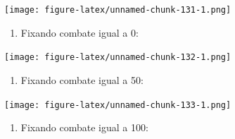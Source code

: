 \documentclass[
]{article}
\newenvironment{Shaded}{\begin{snugshade}}{\end{snugshade}}
\newcommand{\DataTypeTok}[1]{\textcolor[rgb]{0.13,0.29,0.53}{#1}}
\newcommand{\DecValTok}[1]{\textcolor[rgb]{0.00,0.00,0.81}{#1}}
\newcommand{\KeywordTok}[1]{\textcolor[rgb]{0.13,0.29,0.53}{\textbf{#1}}}
\newcommand{\NormalTok}[1]{#1}
\newcommand{\OperatorTok}[1]{\textcolor[rgb]{0.81,0.36,0.00}{\textbf{#1}}}
\newcommand{\StringTok}[1]{\textcolor[rgb]{0.31,0.60,0.02}{#1}}
\providecommand{\tightlist}{%
  \setlength{\itemsep}{0pt}\setlength{\parskip}{0pt}}
\begin{document}
\texttt{[image: figure-latex/unnamed-chunk-131-1.png]}

\begin{enumerate}
\def\labelenumi{\arabic{enumi}.}
\setcounter{enumi}{6}
\tightlist
\item
  Fixando combate igual a 0:
\end{enumerate}

\begin{Shaded}
\end{Shaded}

\texttt{[image: figure-latex/unnamed-chunk-132-1.png]}

\begin{enumerate}
\def\labelenumi{\arabic{enumi}.}
\setcounter{enumi}{7}
\tightlist
\item
  Fixando combate igual a 50:
\end{enumerate}

\begin{Shaded}
\end{Shaded}

\texttt{[image: figure-latex/unnamed-chunk-133-1.png]}

\begin{enumerate}
\def\labelenumi{\arabic{enumi}.}
\setcounter{enumi}{8}
\tightlist
\item
  Fixando combate igual a 100:
\end{enumerate}

\begin{Shaded}
\end{Shaded}
\end{document}
